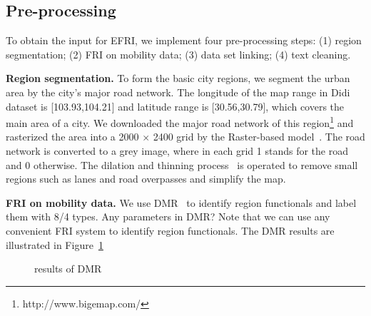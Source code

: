 \documentclass[runningheads]{llncs}
\begin{document}
\subsection{Pre-processing}

To obtain the input for EFRI, we implement four pre-processing steps: (1) region segmentation; (2) FRI on mobility data; (3) data set linking; (4) text cleaning. 

\textbf{Region segmentation.} To form the basic city regions, we segment the urban area by the city's major road network.
The longitude of the map range in Didi dataset is [103.93,104.21] and latitude range is [30.56,30.79], which covers the main area of a city.%
We downloaded the major road network of this region\footnote{http://www.bigemap.com/} and rasterized the area into a 2000 $\times$ 2400 grid by the Raster-based model~\cite{}.
The road network is converted to a grey image, where in each grid 1 stands for the road and $0$ otherwise. %
 The dilation and thinning process~\cite{} is operated to remove small regions such as lanes and road overpasses and simplify the map.
 
\textbf{FRI on mobility data.} We use DMR~\cite{} to identify region functionals and label them with  8/4 types. %
Any parameters in DMR?
Note that we can use any convenient FRI system to identify region functionals.
The DMR results are illustrated in Figure~\ref{fig:DMR}


\begin{figure}[h]
\centering
{}
\caption{results of DMR}
\label{fig:DMR}
\end{figure}
\end{document}
